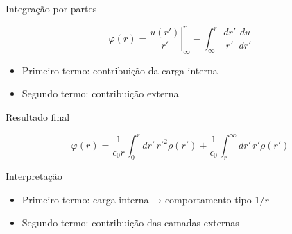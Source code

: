 \documentclass[aspectratio=169,11pt]{beamer}
\begin{document}
\begin{frame}{Integração por partes}

\begin{eqbox}
\begin{equation}
\varphi(r)
=
\left.\frac{u(r')}{r'}\right|_{\infty}^{r}
-
\int_{\infty}^{r}
\frac{dr'}{r'}\,\frac{du}{dr'}
\end{equation}
\end{eqbox}

\begin{itemize}
\item Primeiro termo: contribuição da carga interna
\item Segundo termo: contribuição externa
\end{itemize}

\end{frame}

\begin{frame}{Resultado final}

\begin{eqbox}
\begin{equation}
\varphi(r)
=
\frac{1}{\epsilon_0 r}
\int_0^r dr'\, r'^2 \rho(r')
+
\frac{1}{\epsilon_0}
\int_r^{\infty} dr'\, r'\rho(r')
\end{equation}
\end{eqbox}

\begin{alertblock}{Interpretação}
\begin{itemize}
\item Primeiro termo: carga interna → comportamento tipo \(1/r\)
\item Segundo termo: contribuição das camadas externas
\end{itemize}
\end{alertblock}

\end{frame}
\end{document}
